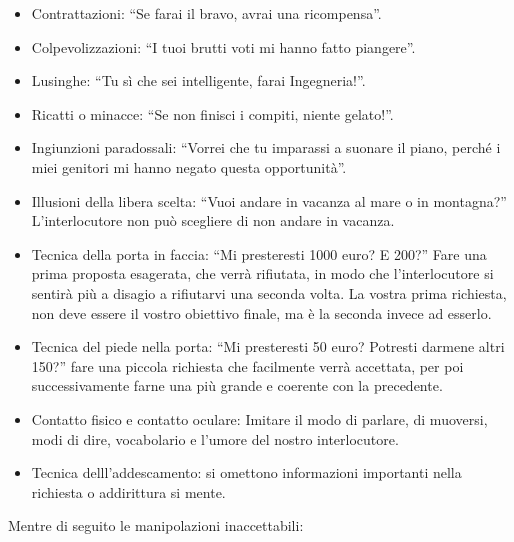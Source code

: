 \documentclass[12pt]{book} %
\begin{document}
\begin{itemize}
\item Contrattazioni: “Se farai il bravo, avrai una ricompensa”. 
\item Colpevolizzazioni: “I tuoi brutti voti mi hanno fatto piangere”. 
\item Lusinghe: “Tu sì che sei intelligente, farai Ingegneria!”. 
\item Ricatti o minacce: “Se non finisci i compiti, niente gelato!”. 
\item Ingiunzioni paradossali: “Vorrei che tu imparassi a suonare il piano, perché i miei genitori mi hanno negato questa opportunità”. 
\item Illusioni della libera scelta: “Vuoi andare in vacanza al mare o in montagna?”
L'interlocutore non può scegliere di non andare in vacanza.
\item Tecnica della porta in faccia: “Mi presteresti 1000 euro? E 200?” Fare una prima proposta esagerata, che verrà
rifiutata, in modo che l'interlocutore si sentirà più a disagio a rifiutarvi una seconda volta. La
vostra prima richiesta, non deve essere il vostro obiettivo finale, ma è la seconda invece ad esserlo.
\item Tecnica del piede nella porta: “Mi presteresti 50 euro? Potresti darmene altri 150?” fare una piccola richiesta
che facilmente verrà accettata, per poi successivamente farne una più grande e coerente con la precedente.
\item Contatto fisico e contatto oculare: Imitare il modo di parlare, di muoversi, modi di dire, vocabolario e l'umore del nostro interlocutore.
\item Tecnica delll'addescamento: si omettono informazioni importanti nella richiesta o addirittura si mente.
\end{itemize}

\bigskip

Mentre di seguito le manipolazioni inaccettabili:
\end{document}
